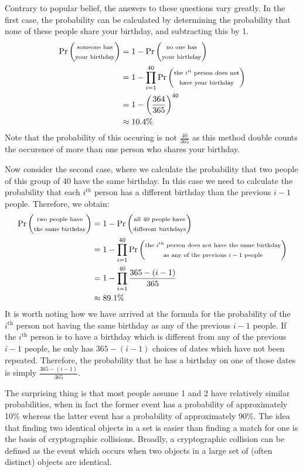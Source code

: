 \documentclass[12pt, a4paper, final]{report}
\begin{document}
Contrary to popular belief, the answers to these questions vary greatly. In
the first case, the probability can be calculated by determining the
probability that none of these people share your birthday, and subtracting
this by 1.
\begin{align*}
    \Pr\begin{pmatrix} \text{\scriptsize someone has}\\ \text{\scriptsize your birthday} \end{pmatrix} & = 1 - \Pr\begin{pmatrix} \text{\scriptsize no one has}\\ \text{\scriptsize your birthday} \end{pmatrix}\\
    & = 1 - \prod_{i = 1}^{40}\Pr\begin{pmatrix} \text{\scriptsize the $i^{\text{it}}$ person does not}\\ \text{\scriptsize have your birthday} \end{pmatrix}\\
    & = 1 - \left(\frac{364}{365}\right)^{40}\\
    & \approx 10.4 \%
\end{align*}
Note that the probability of this occuring is not $\frac{40}{365}$ as this
method double counts the occurence of more than one person who shares your
birthday.

Now consider the second case, where we calculate the probability that two
people of this group of 40 have the same birthday. In this case we need
to calculate the probability that each $i^{th}$ person has a different
birthday than the previous $i - 1$ people. Therefore, we obtain:
\begin{align*}
    \Pr\begin{pmatrix} \text{\scriptsize two people have}\\ \text{\scriptsize the same birthday} \end{pmatrix} & = 1 - \Pr\begin{pmatrix} \text{\scriptsize all 40 people have}\\ \text{\scriptsize different birthdays} \end{pmatrix}\\
    & = 1 - \prod_{i = 1}^{40}\Pr\begin{pmatrix} \text{\scriptsize the $i^{\text{th}}$ person does not have the same birthday}\\ \text{\scriptsize as any of the previous $i - 1$ people} \end{pmatrix}\\
    & = 1 - \prod_{i = 1}^{40}\frac{365 - (i - 1)}{365}\\
    & \approx 89.1 \%
\end{align*}
It is worth noting how we have arrived at the formula for the probability of the
$i^{\text{th}}$ person not having the same birthday as any of the previous
$i - 1$ people. If the $i^{\text{th}}$ person is to have a birthday which is
different from any of the previous $i - 1$ people, he only has $365 - (i - 1)$
choices of dates which have not been repeated. Therefore, the probability
that he has a birthday on one of those dates is simply $\frac{365 - (i - 1)}
{365}$.

The surprising thing is that most people assume 1 and 2 have relatively similar
probabilities, when in fact the former event has a probability of approximately
10\% whereas the latter event has a probability of approximately 90\%. The idea
that finding two identical objects in a set is easier than finding a match for
one is the basis of cryptographic collisions. Broadly, a cryptographic collision
can be defined as the event which occurs when two objects in a large set of
(often distinct) objects are identical.
\end{document}
